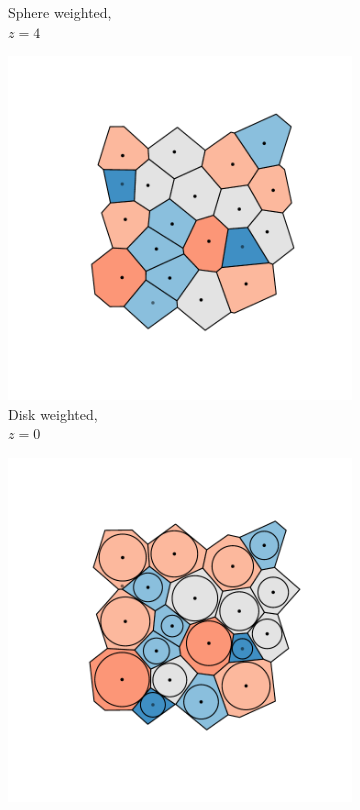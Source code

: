 \begin{figure}[tb]
\begin{subfigure}[b]{0.23\textwidth}
         \caption{Sphere weighted, \\$z=4$}
         \label{fig:cut40a}
     \end{subfigure}
     \hfill
     \vspace{0.2cm}
     
      \begin{subfigure}[b]{0.23\textwidth}
         \centering
         \includegraphics[width=\textwidth]{./figures/quasi2d/cut_z0_b.pdf}
         \caption{Disk weighted, \\$z=0$}
         \label{fig:cut0b}
     \end{subfigure}
     \hfill
      \begin{subfigure}[b]{0.23\textwidth}
         \centering
         \includegraphics[width=\textwidth]{./figures/quasi2d/cut_z10_b.pdf}

\end{subfigure}
\end{figure}
